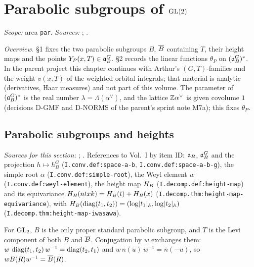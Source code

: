 
\chapter{Parabolic subgroups of \texorpdfstring{$\mathrm{GL}(2)$}{GL(2)}}\label{ch:ch-02-parabolic}

\noindent\emph{Scope:} area \texttt{par}. \emph{Sources:} \cite[§§5, 11, 17]{AIntro}; \cite[Lecture IV §1, Lecture VII §1]{Gel}.

\noindent\emph{Overview.} §1 fixes the two parabolic subgroups $B$, $\overline{B}$ containing $T$, their height maps and the points
$Y_P(x,T)\in\mathfrak{a}_B^G$. §2 records the linear functions $\theta_P$ on $(\mathfrak{a}_B^G)^*$. In the parent project this chapter continues with Arthur's
$(G,T)$-families and the weight $v(x,T)$ of the weighted orbital integrals; that material is analytic (derivatives, Haar measures) and
not part of this volume. The parameter of $(\mathfrak{a}_B^G)^*$ is the real number $\lambda=\Lambda(\alpha^\vee)$, and the lattice $\mathbb{Z}\alpha^\vee$ is
given covolume $1$ (decisions D-GMF and D-NORMS of the parent's sprint note M7a); this fixes $\theta_P$.

\section{Parabolic subgroups and heights}\label{sec:par-heights}

\noindent\emph{Sources for this section:} \cite[§§5, 11]{AIntro}; \cite[Lecture II §1, Lecture IV §1]{Gel}. References to Vol.~I by item ID:
$\mathfrak{a}_B$, $\mathfrak{a}_B^G$ and the projection $h\mapsto h_B^G$ (\texttt{I.conv.def:space-a-b}, \texttt{I.conv.def:space-a-b-g}), the simple root $\alpha$
(\texttt{I.conv.def:simple-root}), the Weyl element $w$ (\texttt{I.conv.def:weyl-element}), the height map $H_B$ (\texttt{I.decomp.def:height-map}) and
its equivariance $H_B(ntxk)=H_B(t)+H_B(x)$ (\texttt{I.decomp.thm:height-map-equivariance}), with $H_B(\operatorname{diag}(t_1,t_2))=(\log\lvert t_1\rvert_{\mathbb{A}},\log\lvert t_2\rvert_{\mathbb{A}})$
(\texttt{I.decomp.thm:height-map-iwasawa}).

\begin{definition}
\end{definition}
\noindent For $\mathrm{GL}_2$, $B$ is the only proper standard parabolic subgroup, and $T$ is the Levi component of both $B$ and $\overline{B}$.
Conjugation by $w$ exchanges them: $w\,\operatorname{diag}(t_1,t_2)\,w^{-1}=\operatorname{diag}(t_2,t_1)$ and $w\,n(u)\,w^{-1}=\bar n(-u)$, so $wB(R)w^{-1}=\overline{B}(R)$.

